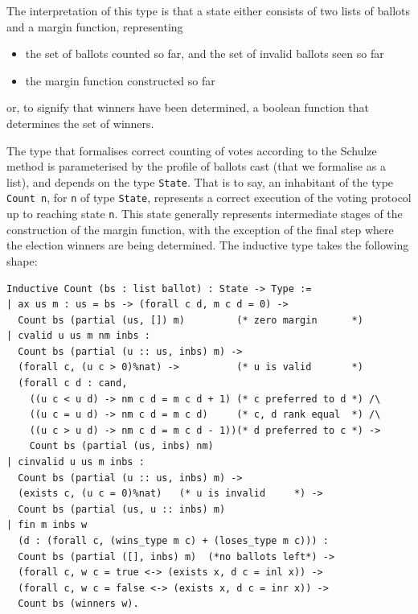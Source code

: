 \noindent
The interpretation of this type is that a state either consists of
two lists of ballots and a margin function, representing

\begin{itemize}
  \item the set of ballots counted so far, and the set of invalid
ballots seen so far
  \item the margin function constructed so far
\end{itemize}
or, to signify that winners have been determined, a boolean function
that determines the set of winners.

The type that formalises correct counting of votes according to the
Schulze method is parameterised by the profile of ballots cast (that
we formalise as a list), and depends on the type \texttt{State}. That
is to say, an inhabitant of the type \texttt{Count n}, for
\texttt{n} of type \texttt{State}, represents a correct execution of
the voting protocol up to reaching state \texttt{n}. This
state generally represents intermediate stages of the construction
of the margin function, with the exception of the final step where
the election winners are being determined. The inductive type takes
the following shape:

\begin{verbatim}
Inductive Count (bs : list ballot) : State -> Type :=
| ax us m : us = bs -> (forall c d, m c d = 0) -> 
  Count bs (partial (us, []) m)         (* zero margin      *)
| cvalid u us m nm inbs : 
  Count bs (partial (u :: us, inbs) m) -> 
  (forall c, (u c > 0)%nat) ->          (* u is valid       *)
  (forall c d : cand, 
    ((u c < u d) -> nm c d = m c d + 1) (* c preferred to d *) /\
    ((u c = u d) -> nm c d = m c d)     (* c, d rank equal  *) /\
    ((u c > u d) -> nm c d = m c d - 1))(* d preferred to c *) ->
    Count bs (partial (us, inbs) nm)
| cinvalid u us m inbs : 
  Count bs (partial (u :: us, inbs) m) -> 
  (exists c, (u c = 0)%nat)   (* u is invalid     *) ->
  Count bs (partial (us, u :: inbs) m)
| fin m inbs w 
  (d : (forall c, (wins_type m c) + (loses_type m c))) :
  Count bs (partial ([], inbs) m)  (*no ballots left*) ->
  (forall c, w c = true <-> (exists x, d c = inl x)) ->
  (forall c, w c = false <-> (exists x, d c = inr x)) ->
  Count bs (winners w).
 
\end{verbatim}

